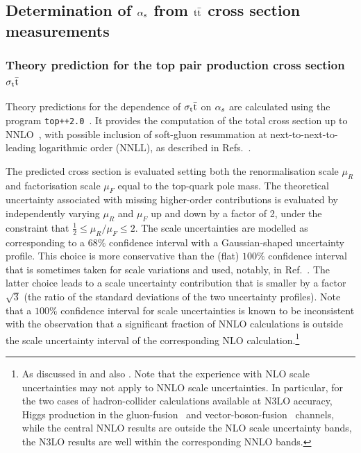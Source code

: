 \subsection{Determination of $\alpha_s$ from $\mathrm{t}\bar{\mathrm{t}}$ cross section measurements}

\subsubsection{Theory prediction for the top pair production cross section $\sigma_\mathrm{t}\bar{\mathrm{t}}$}
\label{sec:theory-predictions}

Theory predictions for the dependence of $\sigma_\mathrm{t}\bar{\mathrm{t}}$ on $\alpha_s$ are
calculated using the program
\texttt{top++2.0}~\cite{topplusplus}. 
%
It provides the computation of the total cross section up to
NNLO~\cite{topplusplus2}, with possible inclusion of soft-gluon
resummation at next-to-next-to-leading logarithmic order (NNLL), as
described in Refs.~\cite{Beneke:2009rj,Czakon:2009zw}.

The predicted cross section is evaluated setting both the
renormalisation scale $\mu_R$ and factorisation scale $\mu_F$ equal to
the top-quark pole mass. 
%
The theoretical uncertainty associated with missing higher-order
contributions is evaluated by independently varying $\mu_R$ and $\mu_F$
up and down by a factor of 2, under the constraint that
$\frac{1}{2} \leq \mu_R / \mu_F \leq 2$.
%
The scale uncertainties are modelled as corresponding to a $68\%$
confidence interval with a Gaussian-shaped uncertainty profile.
%
This choice is more conservative than the (flat) $100\%$ confidence
interval that is sometimes taken for scale variations and used,
notably, in Ref.~\cite{CMS-ttbar-alphas}. 
%
The latter choice leads to a scale
uncertainty contribution that is smaller by a factor $\sqrt{3}$ (the
ratio of the standard deviations of the two uncertainty profiles).
%
Note that a $100\%$ confidence
interval for scale uncertainties is known to be inconsistent with the
observation that a significant fraction of NNLO calculations is
outside the scale uncertainty interval of the corresponding NLO
calculation.\footnote{As discussed in \cite{Bagnaschi:2014wea} and
  also \cite{GavinLHCPtalk}. 
  Note that the experience with NLO scale uncertainties may not apply
  to NNLO scale uncertainties.
  In particular, for the two cases of hadron-collider calculations
  available at N3LO accuracy, Higgs production in the
  gluon-fusion~\cite{Anastasiou:2016cez} and
  vector-boson-fusion~\cite{Dreyer:2016oyx} channels, while the
  central NNLO results are outside the NLO scale uncertainty bands, the N3LO
  results are well within the corresponding NNLO bands. }

